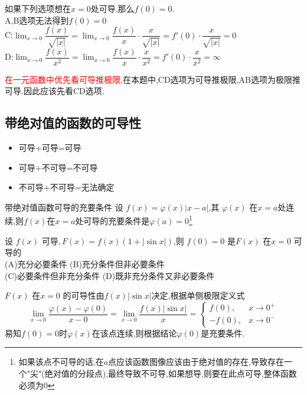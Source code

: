 \documentclass[8pt a4paper, oneside, UTF8]{ctexbook}  %
\begin{document}
\begin{sloppypar}
\begin{solution}
        如果下列选项想在$x=0$处可导,那么$f(0)=0$.\\
        A,B选项无法得到$f(0)=0$\\
        C:$\lim_{x\to 0}\dfrac{f(x)}{\sqrt{|x|}}=\lim_{x\to 0} \dfrac{f(x)}{x}\cdot \dfrac{x}{\sqrt{|x|}}=f'(0)\cdot \dfrac{x}{\sqrt{|x|}}=0$\\
        D:$\lim_{x\to 0}\dfrac{f(x)}{x^2}=\lim_{x\to 0} \dfrac{f(x)}{x}\cdot \dfrac{x}{x^2}=f'(0)\cdot \dfrac{x}{x^2}=\infty$
    \end{solution}
    \begin{note}    
        \textcolor{red}{在一元函数中优先看可导推极限},在本题中,CD选项为可导推极限,AB选项为极限推可导.因此应该先看CD选项.
    \end{note}
    \subsection{带绝对值的函数的可导性}
    \begin{itemize}
        \item 可导+可导=可导
        \item 可导+不可导=不可导
        \item 不可导+不可导=无法确定
    \end{itemize}
    \begin{conclusion}{带绝对值函数可导的充要条件}{}
        设 $f(x)=\varphi(x)\left|x-a\right|$,其 $\varphi(x)$ 在$x=a$处连续,则$f\left(x\right)$在$x=a$处可导的充要条件是$\varphi\left(a\right)=0$\footnote{如果该点不可导的话,在$a$点应该函数图像应该由于绝对值的存在,导致存在一个"尖"(绝对值的分段点),最终导致不可导,如果想导,则要在此点可导,整体函数必须为0}
    \end{conclusion}
    \begin{problem}
    设 $f(x)$ 可导$,F(x)=f(x)(1+|\sin x|)$,则 $f(0)=0$ 是$F(x)$ 在$x=0$ 可导的\\
    (A)充分必要条件 \quad (B)充分条件但非必要条件\\
    (C)必要条件但非充分条件 \quad (D)既非充分条件又非必要条件        
    \end{problem}
    \begin{solution}
        $F(x)$ 在$x=0$ 的可导性由$f(x)|\sin x|$决定,根据单侧极限定义式
        $$\lim\limits_{x\to0}\frac{\varphi(x)-\varphi(0)}{x-0}=\lim\limits_{x\to0}\frac{f(x)\left|\sin x\right|}{x}=\begin{cases}f(0) ,&x\to0^+\\[2ex]-f(0) ,&x\to0^-\end{cases}$$
        易知$f(0)=0$时$\varphi(x)$在该点连续,则根据结论$\varphi(0)$是充要条件.

\end{solution}
\end{sloppypar}
\end{document}
